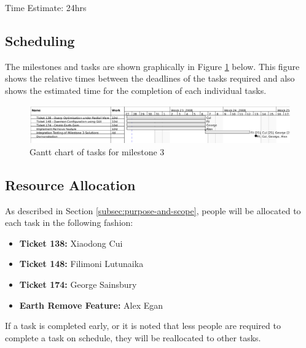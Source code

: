 \documentclass[10pt,a4,oneside]{article}
\begin{document}
\noindent Time Estimate: 24hrs

 
\subsection{Scheduling}
 
The milestones and tasks are shown graphically in Figure \ref{fig:m3gannt} below. This figure shows the
 relative times between the deadlines of the tasks required and also shows the estimated time for the completion of each individual tasks.\\
 
\begin{figure}[h!]
\begin{centering}
\includegraphics[width=150mm]{figs/m3}
\end{centering}
\caption{Gantt chart of tasks for milestone 3}
\label{fig:m3gannt}
\end{figure}

\newpage

\subsection{Resource Allocation}
 
As described in Section \ref{subsec:purpose-and-scope}, people will be allocated to each task in the following fashion:
 
\begin{itemize}
  
\item \textbf{Ticket 138:} Xiaodong Cui \\
 
\item \textbf{Ticket 148:} Filimoni Lutunaika \\
 
\item \textbf{Ticket 174:} George Sainsbury \\
 
\item \textbf{Earth Remove Feature:} Alex Egan \\
 
\end{itemize}
 
If a task is completed early, or it is noted that less people are required to complete a task on schedule, they will be reallocated to other tasks.\\
 
\end{document}
